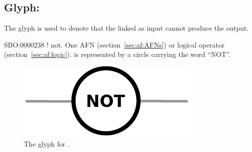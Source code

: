 \subsection{Glyph: }
\label{sec:af:not}

The glyph  is used to denote that the  linked as input cannot produce the output.

\begin{glyphDescription}
 \glyphSboTerm SBO:0000238 ! not.
 \glyphOrigin One AFN (section~\ref{sec:af:AFNs}) or logical operator (section~\ref{sec:af:logic}).
 \glyphTarget
 \glyphNode {} is represented by a circle carrying the word ``NOT''.
 \end{glyphDescription}

\begin{figure}[H]
  \centering
  \includegraphics[scale = 0.5]{images/not}
  \caption{The \AF glyph for .}
  \label{fig:af:not}
\end{figure}

